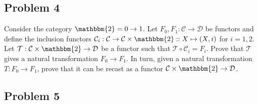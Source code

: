 \documentclass{amsart}
\theoremstyle{remark}
\theoremstyle{definition}
\theoremstyle{definition}
\begin{document}
\subsection{Problem 4}

Consider the category $\mathbbm{2}=0\to 1$. Let $F_0,F_1:\mathcal{C}\to\mathcal{D}$ be functors and define the inclusion functors $\mathcal{C}_{i}:\mathcal{C}\to\mathcal{C}\times\mathbbm{2}::X\mapsto (X,i)$ for $i=1,2$. Let $\mathcal{T}:\mathcal{C}\times\mathbbm{2}\to\mathcal{D}$ be a functor such that $\mathcal{T}\circ\mathcal{C}_i=F_i$. Prove that $\mathcal{T}$ gives a natural transformation $F_0\to F_1$. In turn, given a natural transformation $T:F_0\to F_1$, prove that it can be recast as a functor $\mathcal{C}\times\mathbbm{2}\to\mathcal{D}$.

\subsection{Problem 5}
\end{document}
